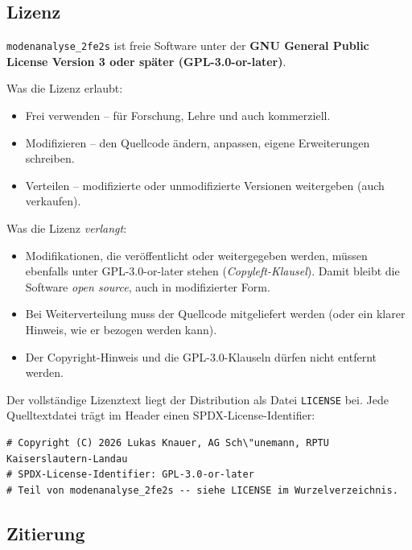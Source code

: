 \documentclass[11pt,a4paper,twoside]{article}
\theoremstyle{remark}
\begin{document}
\subsection{Lizenz}

\texttt{modenanalyse\_2fe2s} ist freie Software unter der
\textbf{GNU General Public License Version 3 oder sp\"ater (GPL-3.0-or-later)}.

Was die Lizenz erlaubt:

\begin{itemize}
  \item Frei verwenden -- f\"ur Forschung, Lehre und auch kommerziell.
  \item Modifizieren -- den Quellcode \"andern, anpassen, eigene
        Erweiterungen schreiben.
  \item Verteilen -- modifizierte oder unmodifizierte Versionen
        weitergeben (auch verkaufen).
\end{itemize}

Was die Lizenz \emph{verlangt}:

\begin{itemize}
  \item Modifikationen, die ver\"offentlicht oder weitergegeben werden,
        m\"ussen ebenfalls unter GPL-3.0-or-later stehen
        (\emph{Copyleft-Klausel}). Damit bleibt die Software
        \emph{open source}, auch in modifizierter Form.
  \item Bei Weiterverteilung muss der Quellcode mitgeliefert werden
        (oder ein klarer Hinweis, wie er bezogen werden kann).
  \item Der Copyright-Hinweis und die GPL-3.0-Klauseln d\"urfen nicht
        entfernt werden.
\end{itemize}

Der vollst\"andige Lizenztext liegt der Distribution als Datei
\texttt{LICENSE} bei. Jede Quelltextdatei tr\"agt im Header einen
SPDX-License-Identifier:

\begin{lstlisting}[style=python]
# Copyright (C) 2026 Lukas Knauer, AG Sch\"unemann, RPTU Kaiserslautern-Landau
# SPDX-License-Identifier: GPL-3.0-or-later
# Teil von modenanalyse_2fe2s -- siehe LICENSE im Wurzelverzeichnis.
\end{lstlisting}

\subsection{Zitierung}
\end{document}
